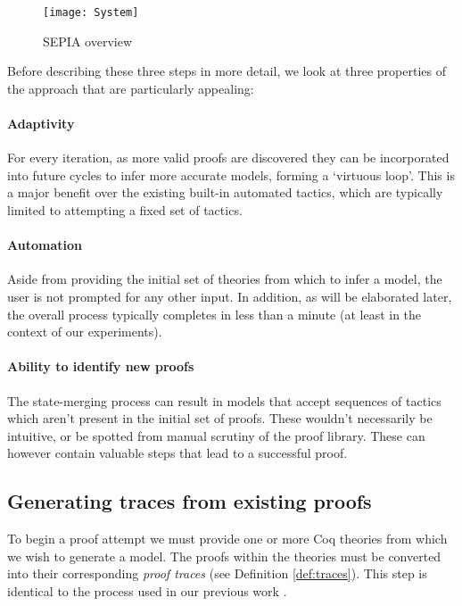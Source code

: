 \documentclass{llncs}
\begin{document}
\begin{figure}[t]
	\centering
	\texttt{[image: System]}
	\caption{SEPIA overview}
	\label{fig:system}
\end{figure} 

Before describing these three steps in more detail, we look at three properties of the approach that are particularly appealing:

\paragraph{Adaptivity} 
For every iteration, as more valid proofs are discovered they can be incorporated into future cycles to infer more accurate models, forming a `virtuous loop'. This is a major benefit over the existing built-in automated tactics, which are typically limited to attempting a fixed set of tactics.

\paragraph{Automation}
Aside from providing the initial set of theories from which to infer a model, the user is not prompted for any other input. In addition, as will be elaborated later, the overall process typically completes in less than a minute (at least in the context of our experiments).

\paragraph{Ability to identify new proofs}
The state-merging process \cite{WalkinshawWCRE} can result in models that accept sequences of tactics which aren't present in the initial set of proofs. These wouldn't necessarily be intuitive, or be spotted from manual scrutiny of the proof library. These can however contain valuable steps that lead to a successful proof.

\subsection{Generating traces from existing proofs}
To begin a proof attempt we must provide one or more Coq theories from which we wish to generate a model. The proofs within the theories must  be converted into their corresponding \emph{proof traces} (see Definition \ref{def:traces}). This step is identical to the process used in our previous work \cite{GransdenCICM}.
\end{document}
